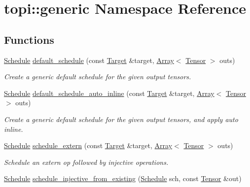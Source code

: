 \hypertarget{namespacetopi_1_1generic}{}\section{topi\+:\+:generic Namespace Reference}
\label{namespacetopi_1_1generic}
\subsection*{Functions}
\begin{DoxyCompactItemize}
\item 
\hyperlink{classtvm_1_1te_1_1Schedule}{Schedule} \hyperlink{namespacetopi_1_1generic_abc753fc92d16de874fb5febde604e4f3}{default\+\_\+schedule} (const \hyperlink{classtvm_1_1Target}{Target} \&target, \hyperlink{classtvm_1_1Array}{Array}$<$ \hyperlink{classtvm_1_1te_1_1Tensor}{Tensor} $>$ outs)
\begin{DoxyCompactList}\small\item\em Create a generic default schedule for the given output tensors. \end{DoxyCompactList}\item 
\hyperlink{classtvm_1_1te_1_1Schedule}{Schedule} \hyperlink{namespacetopi_1_1generic_a105c5aaed7d861da8ae27259126722ba}{default\+\_\+schedule\+\_\+auto\+\_\+inline} (const \hyperlink{classtvm_1_1Target}{Target} \&target, \hyperlink{classtvm_1_1Array}{Array}$<$ \hyperlink{classtvm_1_1te_1_1Tensor}{Tensor} $>$ outs)
\begin{DoxyCompactList}\small\item\em Create a generic default schedule for the given output tensors, and apply auto inline. \end{DoxyCompactList}\item 
\hyperlink{classtvm_1_1te_1_1Schedule}{Schedule} \hyperlink{namespacetopi_1_1generic_a63d40a8d62c878ba683e3f945bd76873}{schedule\+\_\+extern} (const \hyperlink{classtvm_1_1Target}{Target} \&target, \hyperlink{classtvm_1_1Array}{Array}$<$ \hyperlink{classtvm_1_1te_1_1Tensor}{Tensor} $>$ outs)
\begin{DoxyCompactList}\small\item\em Schedule an extern op followed by injective operations. \end{DoxyCompactList}\item 
\hyperlink{classtvm_1_1te_1_1Schedule}{Schedule} \hyperlink{namespacetopi_1_1generic_a301d2d9cb6cdba4de67325c37df037dd}{schedule\+\_\+injective\+\_\+from\+\_\+existing} (\hyperlink{classtvm_1_1te_1_1Schedule}{Schedule} sch, const \hyperlink{classtvm_1_1te_1_1Tensor}{Tensor} \&out)

\end{DoxyCompactItemize}
